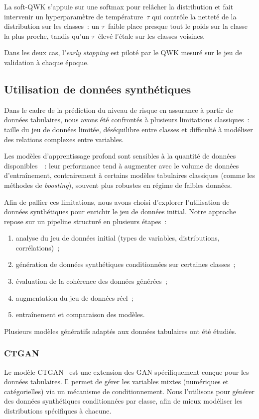 \documentclass[conference]{IEEEtran}
\begin{document}
La soft-QWK s'appuie sur une softmax pour relâcher la distribution et fait intervenir un hyperparamètre de température~$\tau$ qui contrôle la netteté de la distribution sur les classes~: un $\tau$~faible place presque tout le poids sur la classe la plus proche, tandis qu'un $\tau$~élevé l'étale sur les classes voisines.

Dans les deux cas, l'\textit{early stopping} est piloté par le QWK mesuré sur le jeu de validation à chaque époque.

\subsection{Utilisation de données synthétiques}

Dans le cadre de la prédiction du niveau de risque en assurance à partir de données tabulaires, nous avons été confrontés à plusieurs limitations classiques~: taille du jeu de données limitée, déséquilibre entre classes et difficulté à modéliser des relations complexes entre variables.

Les modèles d'apprentissage profond sont sensibles à la quantité de données disponibles~\cite{goodfellow2016deep}~: leur performance tend à augmenter avec le volume de données d'entraînement, contrairement à certains modèles tabulaires classiques (comme les méthodes de \textit{boosting}), souvent plus robustes en régime de faibles données.

Afin de pallier ces limitations, nous avons choisi d'explorer l'utilisation de données synthétiques pour enrichir le jeu de données initial. Notre approche repose sur un pipeline structuré en plusieurs étapes~:
\begin{enumerate}
    \item analyse du jeu de données initial (types de variables, distributions, corrélations)~;
    \item génération de données synthétiques conditionnées sur certaines classes~;
    \item évaluation de la cohérence des données générées~;
    \item augmentation du jeu de données réel~;
    \item entraînement et comparaison des modèles.
\end{enumerate}

Plusieurs modèles génératifs adaptés aux données tabulaires ont été étudiés.

\subsubsection{CTGAN}
Le modèle CTGAN~\cite{xu2019modeling} est une extension des GAN spécifiquement conçue pour les données tabulaires. Il permet de gérer les variables mixtes (numériques et catégorielles) via un mécanisme de conditionnement. Nous l'utilisons pour générer des données synthétiques conditionnées par classe, afin de mieux modéliser les distributions spécifiques à chacune.
\end{document}
